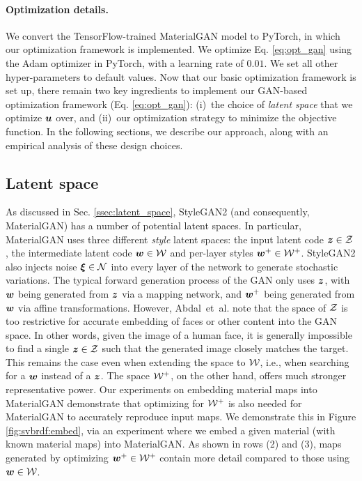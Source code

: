 \paragraph{Optimization details.}
We convert the TensorFlow-trained MaterialGAN model to PyTorch, in which our optimization framework is implemented. We optimize Eq. \ref{eq:opt_gan} using the Adam optimizer in PyTorch, with a learning rate of $0.01$. We set all other hyper-parameters to default values.
Now that our basic optimization framework is set up, there remain two key ingredients to implement our GAN-based optimization framework (Eq. \eqref{eq:opt_gan}): (i)~the choice of \emph{latent space} that we optimize $\bm{u}$ over, and (ii)~our optimization strategy to minimize the objective function. In the following sections, we describe our approach, along with an empirical analysis of these design choices.


\subsection{Latent space}
\label{ssec:latent}

As discussed in Sec. \ref{ssec:latent_space}, StyleGAN2 (and consequently, MaterialGAN) has a number of potential latent spaces.
In particular, MaterialGAN uses three different \emph{style} latent spaces: the input latent code $\bm{z} \in \mathcal{Z}$ , the intermediate latent code $\bm{w} \in \mathcal{W}$ and per-layer styles $\bm{w}^+ \in \mathcal{W}^+$.
StyleGAN2 also injects noise $\bm\xi \in \mathcal{N}$ into every layer of the network to generate stochastic variations.
The typical forward generation process of the GAN only uses $\bm{z}$, with $\bm{w}$ being generated from $\bm{z}$ via a mapping network, and $\bm{w}^+$ being generated from $\bm{w}$ via affine transformations.
However, Abdal~et~al. \cite{abdal2019image2stylegan} note that the space of $\mathcal{Z}$ is too restrictive for accurate embedding of faces or other content into the GAN space.
In other words, given the image of a human face, it is generally impossible to find a single $\bm{z} \in \mathcal{Z}$ such that the generated image closely matches the target.
This remains the case even when extending the space to $\mathcal{W}$, i.e., when searching for a $\bm{w}$ instead of a $\bm{z}$.
The space $\mathcal{W}^+$, on the other hand, offers much stronger representative power.
Our experiments on embedding material maps into MaterialGAN demonstrate that optimizing for $\mathcal{W}^+$ is also needed for MaterialGAN to accurately reproduce input maps.
We demonstrate this in Figure \ref{fig:svbrdf:embed}, via an experiment where we embed a given material (with known material maps) into MaterialGAN.
As shown in rows (2) and (3), maps generated by optimizing $\bm{w}^+ \in \mathcal{W}^+$ contain more detail compared to those using $\bm{w} \in \mathcal{W}$.

